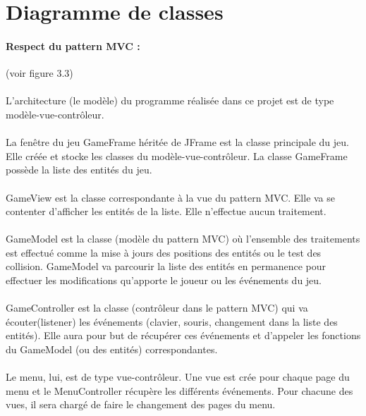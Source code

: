 \documentclass[a4paper,12pt]{report}
\begin{document}
\section{Diagramme de classes}

\paragraph{Respect du pattern MVC :}(voir figure 3.3)

\paragraph{}L'architecture (le modèle) du programme réalisée dans ce projet est de type modèle-vue-contrôleur.

\paragraph{}La fenêtre du jeu GameFrame héritée de JFrame est la classe principale du jeu. Elle créée et  stocke les classes du modèle-vue-contrôleur. La classe GameFrame possède la liste des entités du jeu.  

\paragraph{}GameView est la classe correspondante à la vue du pattern MVC. Elle va se contenter d'afficher les entités de la liste. Elle n'effectue aucun traitement.

\paragraph{}GameModel est la classe (modèle du pattern MVC) où l'ensemble des traitements est effectué comme la mise à jours des positions des entités ou le test des collision. GameModel va parcourir la liste des entités en permanence pour effectuer les modifications qu'apporte le joueur ou les événements du jeu.

\paragraph{}GameController est la classe (contrôleur dans le pattern MVC) qui va écouter(listener) les événements (clavier, souris, changement dans la liste des entités). Elle aura pour but de récupérer ces événements et d'appeler les fonctions du GameModel (ou des entités) correspondantes.

\paragraph{}Le menu, lui, est de type vue-contrôleur. Une vue est crée pour chaque page du menu et le MenuController récupère les différents événements. Pour chacune des vues, il sera chargé de faire le changement des pages du menu.
\end{document}
